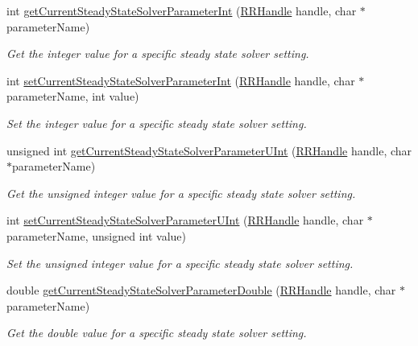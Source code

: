 \begin{DoxyCompactItemize}
int \hyperlink{group__simopts_gaa9d75e9d517748ca24a31bdc7aabd403}{get\+Current\+Steady\+State\+Solver\+Parameter\+Int} (\hyperlink{rrc__types_8h_a1d68f0592372208fa5a5f2799ea4b3ae}{R\+R\+Handle} handle, char $\ast$parameter\+Name)
\begin{DoxyCompactList}\small\item\em Get the integer value for a specific steady state solver setting. \end{DoxyCompactList}\item 
int \hyperlink{group__simopts_gabfe7778b94e2c0311cb58ed61fa84697}{set\+Current\+Steady\+State\+Solver\+Parameter\+Int} (\hyperlink{rrc__types_8h_a1d68f0592372208fa5a5f2799ea4b3ae}{R\+R\+Handle} handle, char $\ast$parameter\+Name, int value)
\begin{DoxyCompactList}\small\item\em Set the integer value for a specific steady state solver setting. \end{DoxyCompactList}\item 
unsigned int \hyperlink{group__simopts_gad591e2afd57f3c63cd9df72949daefb1}{get\+Current\+Steady\+State\+Solver\+Parameter\+U\+Int} (\hyperlink{rrc__types_8h_a1d68f0592372208fa5a5f2799ea4b3ae}{R\+R\+Handle} handle, char $\ast$parameter\+Name)
\begin{DoxyCompactList}\small\item\em Get the unsigned integer value for a specific steady state solver setting. \end{DoxyCompactList}\item 
int \hyperlink{group__simopts_ga3091b392515179d6993e9255f327cb3e}{set\+Current\+Steady\+State\+Solver\+Parameter\+U\+Int} (\hyperlink{rrc__types_8h_a1d68f0592372208fa5a5f2799ea4b3ae}{R\+R\+Handle} handle, char $\ast$parameter\+Name, unsigned int value)
\begin{DoxyCompactList}\small\item\em Set the unsigned integer value for a specific steady state solver setting. \end{DoxyCompactList}\item 
double \hyperlink{group__simopts_gaef590828bd962f47e941ca74b09a93ac}{get\+Current\+Steady\+State\+Solver\+Parameter\+Double} (\hyperlink{rrc__types_8h_a1d68f0592372208fa5a5f2799ea4b3ae}{R\+R\+Handle} handle, char $\ast$parameter\+Name)
\begin{DoxyCompactList}\small\item\em Get the double value for a specific steady state solver setting. \end{DoxyCompactList}\item 

\end{DoxyCompactItemize}
